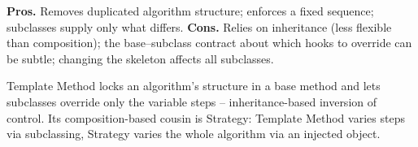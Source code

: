 \begin{complexitybox}
\textbf{Pros.} Removes duplicated algorithm structure; enforces a fixed
sequence; subclasses supply only what differs. \textbf{Cons.} Relies on
inheritance (less flexible than composition); the base--subclass contract
about which hooks to override can be subtle; changing the skeleton affects
all subclasses.
\end{complexitybox}

\begin{takeawaybox}
Template Method locks an algorithm's structure in a base method and lets
subclasses override only the variable steps -- inheritance-based inversion
of control. Its composition-based cousin is Strategy: Template Method
varies steps via subclassing, Strategy varies the whole algorithm via an
injected object.
\end{takeawaybox}
